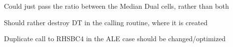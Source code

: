 
\begin{DoxyRefList}
\item[Subprogram \mbox{\hyperlink{update3_8_f_ae9beb85f0cde659cc46f1c1253326e11}{R\+H\+S4\+A\+LE}} (N\+O\+F\+V\+AR, N\+P\+O\+IN, R\+HS, U, V\+M\+D\+CO, V\+M\+D\+CN)]\label{todo__todo000002}%
%
Could just pass the ratio between the Median Dual cells, rather than both  
\item[Subprogram \mbox{\hyperlink{update3_8_f_a9b5311bee4132b02d75a204897914de7}{U\+P\+D\+A\+T\+E3}} (N\+D\+IM, N\+O\+F\+V\+AR, N\+P\+O\+IN, Flow\+Solver, A, R\+HS, DT, U, V\+M\+D\+CO, V\+M\+D\+CN, Nodal\+Bcs)]\label{todo__todo000001}%
%
Should rather destroy DT in the calling routine, where it is created 

Duplicate call to {\ttfamily R\+H\+S\+B\+C4} in the {\ttfamily A\+LE} case should be changed/optimized 
\end{DoxyRefList}